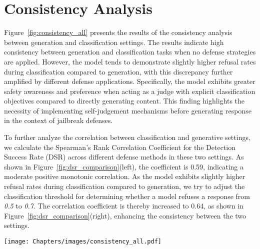 \section{Consistency Analysis}
\label{sec:consistency_appendix}
Figure~\ref{fig:consistency_all} presents the results of the consistency analysis between generation and classification settings. 
The results indicate high consistency between generation and classification tasks when no defense strategies are applied. However, the model tends to demonstrate slightly higher refusal rates during classification compared to generation, with this discrepancy further amplified by different defense applications. Specifically, the model exhibits greater safety awareness and preference when acting as a judge with explicit classification objectives compared to directly generating content. This finding highlights the necessity of implementing self-judgement mechanisms before generating response in the context of jailbreak defenses.


To further analyze the correlation between classification and generative settings, we calculate the Spearman's Rank Correlation Coefficient for the Detection Success Rate (DSR) across different defense methods in these two settings. As shown in Figure~\ref{fig:dsr_comparison}(left), the coefficient is 0.59, indicating a moderate positive monotonic correlation. As the model exhibits slightly higher refusal rates during classification compared to generation, we try to adjust the classification threshold for determining whether a model refuses a response from \emph{0.5} to \emph{0.7}. The correlation coefficient is thereby increased to 0.64, as shown in Figure~\ref{fig:dsr_comparison}(right), enhancing the consistency between the two settings.


\begin{figure*}[!ht]
    \centering
    \texttt{[image: Chapters/images/consistency\_all.pdf]}
    \caption{All consistency analysis results on different defense strategies.}
    \label{fig:consistency_all}
\end{figure*}

